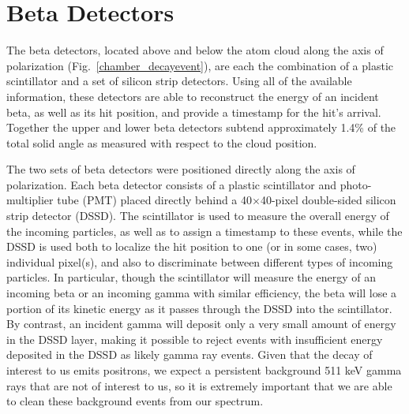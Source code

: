 
{
	\pagebreak
}
{}
\section{Beta Detectors}
\label{section:betadetectors}
The beta detectors, located above and below the atom cloud along the axis of polarization (Fig.~\ref{chamber_decayevent}), are each the combination of a plastic scintillator and a set of silicon strip detectors.  Using all of the available information, these detectors are able to reconstruct the energy of an incident beta, as well as its hit position, and provide a timestamp for the hit's arrival.  Together the upper and lower beta detectors subtend approximately 1.4\% of the total solid angle as measured with respect to the cloud position. 

	The two sets of beta detectors were positioned directly along the axis of polarization.  Each beta detector consists of a plastic scintillator and photo-multiplier tube (PMT)  placed directly behind a 40$\times$40-pixel double-sided silicon strip detector (DSSD).    The scintillator is used to measure the overall energy of the incoming particles, as well as to assign a timestamp to these events, while the DSSD is used both to localize the hit position to one (or in some cases, two) individual pixel(s), and also to discriminate between different types of incoming particles.  In particular, though the scintillator will measure the energy of an incoming beta or an incoming gamma with similar efficiency, the beta will lose a portion of its kinetic energy as it passes through the DSSD into the scintillator.  By contrast, an incident gamma will deposit only a very small amount of energy in the DSSD layer, making it possible to reject events with insufficient energy deposited in the DSSD as likely gamma ray events.  Given that the decay of interest to us emits positrons, we expect a persistent background 511 keV gamma rays that are not of interest to us, so it is extremely important that we are able to clean these background events from our spectrum. 


